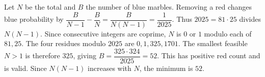 Let $N$ be the total and $B$ the number of blue marbles. Removing a red changes blue probability by $\dfrac{B}{N-1}-\dfrac{B}{N}=\dfrac{B}{N(N-1)}=\dfrac{1}{2025}$. Thus $2025=81\cdot25$ divides $N(N-1)$. Since consecutive integers are coprime, $N$ is $0$ or $1$ modulo each of $81,25$. The four residues modulo $2025$ are $0,1,325,1701$. The smallest feasible $N>1$ is therefore $325$, giving $B=\dfrac{325\cdot324}{2025}=52$. This has positive red count and is valid. Since $N(N-1)$ increases with $N$, the minimum is $\boxed{52}$.
